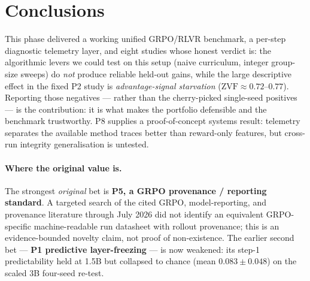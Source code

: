 \documentclass[12pt,a4paper]{report}
\newcommand{\zvf}{\mathrm{ZVF}}
\begin{document}
\section{Conclusions}
This phase delivered a working unified GRPO/RLVR benchmark, a per-step diagnostic
telemetry layer, and eight studies whose honest verdict is: the algorithmic levers we
could test on this setup (naive curriculum, integer group-size sweeps) do \emph{not}
produce reliable held-out gains, while the large descriptive effect in the fixed P2
study is \emph{advantage-signal starvation} ($\zvf \approx 0.72$--$0.77$).
Reporting those negatives
--- rather than the cherry-picked single-seed positives --- is the contribution: it is
what makes the portfolio defensible and the benchmark trustworthy. P8 supplies a
proof-of-concept systems result: telemetry separates the available method traces
better than reward-only features, but cross-run integrity generalisation is untested.

\paragraph{Where the original value is.} The strongest \emph{original} bet is
\textbf{P5, a GRPO provenance / reporting standard}. A targeted search of the
cited GRPO, model-reporting, and provenance literature through July 2026 did not
identify an equivalent GRPO-specific machine-readable run datasheet with rollout
provenance; this is an evidence-bounded novelty claim, not proof of non-existence.
The earlier second bet --- \textbf{P1 predictive
layer-freezing} --- is now weakened: its step-1 predictability held at 1.5B but
collapsed to chance (mean $0.083\pm0.048$) on the scaled 3B four-seed re-test.
\end{document}
